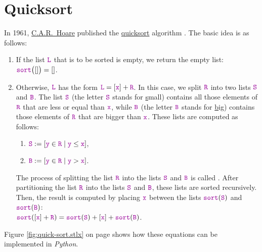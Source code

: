 \section{Quicksort}
In 1961, \href{http://en.wikipedia.org/wiki/Tony_Hoare}{C.A.R.~Hoare}  published the
\href{http://en.wikipedia.org/wiki/Quicksort}{quicksort} algorithm \cite{hoare:61}.  The basic idea is as follows:
\begin{enumerate}
\item If the list $\mytt{L}$ that is to be sorted is empty, we return  the empty list: 
      \\[0.2cm]
      \hspace*{1.3cm} $\mytt{sort}\bigl([]\bigr) = []$.
\item Otherwise, $\mytt{L}$ has the form $\mytt{L} = [\mytt{x}] + \mytt{R}$.  In this case, we split $\mytt{R}$ into two lists $\mytt{S}$ and $\mytt{B}$.
      The list $\mytt{S}$ (the letter $\mytt{S}$ stands for \underline{s}mall) contains all those elements of $\mytt{R}$ that are less
      or equal than $\mytt{x}$,     while $\mytt{B}$ (the letter $\mytt{B}$ stands for \underline{b}ig) contains
      those elements of $\mytt{R}$ that are bigger than $\mytt{x}$.  These lists are computed as follows:
      \begin{enumerate}
      \item $\mytt{S} := [\mytt{y} \in \mytt{R} \mid \mytt{y} \leq \mytt{x}]$,
      \item $\mytt{B} := [\mytt{y} \in \mytt{R} \mid \mytt{y} > \mytt{x}]$.
      \end{enumerate}
      The process of splitting the list $\mytt{R}$ into the lists $\mytt{S}$ and $\mytt{B}$
      is called .  After partitioning the list $\mytt{R}$ into the
      lists $\mytt{S}$ and $\mytt{B}$, these lists are sorted 
      recursively.  Then, the result is computed by placing $\mytt{x}$ between the lists $\mytt{sort}(\mytt{S})$ and $\mytt{sort}(\mytt{B})$:
      \\[0.2cm]
      \hspace*{1.3cm}
      $\mytt{sort}([\mytt{x}]+\mytt{R}) = \mytt{sort}(\mytt{S}) + [\mytt{x}] + \mytt{sort}(\mytt{B})$.
\end{enumerate}
Figure \ref{fig:quick-sort.stlx} on page \pageref{fig:quick-sort.stlx} shows how these equations can
be implemented in \textsl{Python}.

